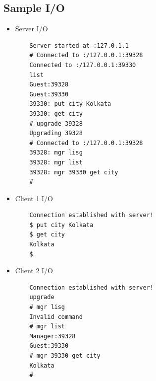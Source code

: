 \documentclass[titlepage]{article}
\begin{document}
	\pagebreak
    \subsection{Sample I/O}

    \begin{itemize}
    \item Server I/O
        \begin{verbatim}
	Server started at :127.0.1.1
	# Connected to :/127.0.0.1:39328
	Connected to :/127.0.0.1:39330
	list
	Guest:39328
	Guest:39330
	39330: put city Kolkata
	39330: get city
	# upgrade 39328
	Upgrading 39328
	# Connected to :/127.0.0.1:39328
	39328: mgr lisg
	39328: mgr list
	39328: mgr 39330 get city
	#
        \end{verbatim}
    \item Client 1 I/O
        \begin{verbatim}
	Connection established with server!
	$ put city Kolkata
	$ get city
	Kolkata
	$
        \end{verbatim}
    \item Client 2 I/O
        \begin{verbatim}
	Connection established with server!
	upgrade
	# mgr lisg
	Invalid command
	# mgr list
	Manager:39328
	Guest:39330
	# mgr 39330 get city
	Kolkata
	#
        \end{verbatim}
    \end{itemize}


    
\end{document}
